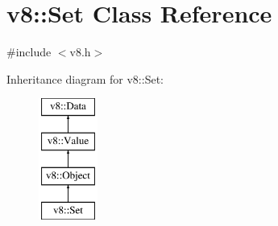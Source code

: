 \hypertarget{classv8_1_1Set}{}\section{v8\+:\+:Set Class Reference}
\label{classv8_1_1Set}


{\ttfamily \#include $<$v8.\+h$>$}

Inheritance diagram for v8\+:\+:Set\+:\begin{figure}[H]
\begin{center}
\leavevmode
\includegraphics[height=4.000000cm]{classv8_1_1Set}
\end{center}
\end{figure}
